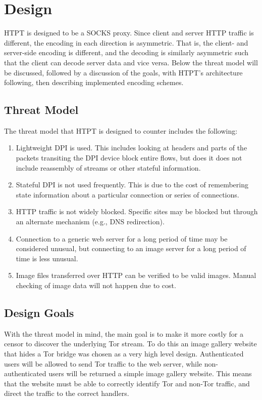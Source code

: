 \section{Design}
HTPT is designed to be a SOCKS proxy. Since client and server HTTP traffic is different, the encoding in each direction is asymmetric. That is, the client- and server-side encoding is different, and the decoding is similarly asymmetric such that the client can decode server data and vice versa. Below the threat model will be discussed, followed by a discussion of the goals, with HTPT's architecture following, then describing implemented encoding schemes.

\subsection{Threat Model}
The threat model that HTPT is designed to counter includes the following:
\begin{enumerate}
  \item Lightweight DPI is used. This includes looking at headers and parts of the packets transiting the DPI device block entire flows, but does it does not include reassembly of streams or other stateful information.
  \item Stateful DPI is not used frequently. This is due to the cost of remembering state information about a particular connection or series of connections.
  \item HTTP traffic is not widely blocked. Specific sites may be blocked but through an alternate mechanism (e.g., DNS redirection).
  \item Connection to a generic web server for a long period of time may be considered unusual, but connecting to an image server for a long period of time is less unusual.
  \item Image files transferred over HTTP can be verified to be valid images. Manual checking of image data will not happen due to cost.
\end{enumerate}

\subsection{Design Goals}
With the threat model in mind, the main goal is to make it more costly for a censor to discover the underlying Tor stream. To do this an image gallery website that hides a Tor bridge was chosen as a very high level design. Authenticated users will be allowed to send Tor traffic to the web server, while non-authenticated users will be returned a simple image gallery website. This means that the website must be able to correctly identify Tor and non-Tor traffic, and direct the traffic to the correct handlers. 

